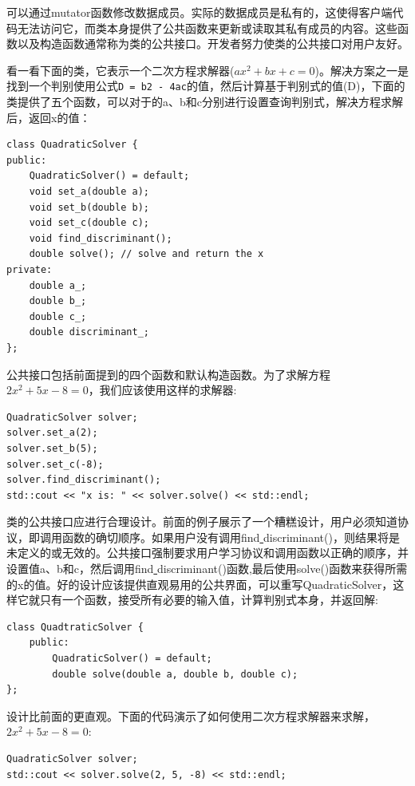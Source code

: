 可以通过mutator函数修改数据成员。实际的数据成员是私有的，这使得客户端代码无法访问它，而类本身提供了公共函数来更新或读取其私有成员的内容。这些函数以及构造函数通常称为类的公共接口。开发者努力使类的公共接口对用户友好。 \par
看一看下面的类，它表示一个二次方程求解器($ax^2 + bx + c = 0$)。解决方案之一是找到一个判别使用公式\texttt{D = b2 - 4ac}的值，然后计算基于判别式的值(D)，下面的类提供了五个函数，可以对于的a、b和c分别进行设置查询判别式，解决方程求解后，返回x的值： \par

\begin{lstlisting}[caption={}]
class QuadraticSolver {
public:
	QuadraticSolver() = default;
	void set_a(double a);
	void set_b(double b);
	void set_c(double c);
	void find_discriminant();
	double solve(); // solve and return the x
private:
	double a_;
	double b_;
	double c_;
	double discriminant_;
};
\end{lstlisting}

公共接口包括前面提到的四个函数和默认构造函数。为了求解方程$2x^2 + 5x - 8 = 0$，我们应该使用这样的求解器: \par

\begin{lstlisting}[caption={}]
QuadraticSolver solver;
solver.set_a(2);
solver.set_b(5);
solver.set_c(-8);
solver.find_discriminant();
std::cout << "x is: " << solver.solve() << std::endl;
\end{lstlisting}

类的公共接口应进行合理设计。前面的例子展示了一个糟糕设计，用户必须知道协议，即调用函数的确切顺序。如果用户没有调用find\underline{ }discriminant()，则结果将是未定义的或无效的。公共接口强制要求用户学习协议和调用函数以正确的顺序，并设置值a、b和c，然后调用find\underline{ }discriminant()函数,最后使用solve()函数来获得所需的x的值。好的设计应该提供直观易用的公共界面，可以重写QuadraticSolver，这样它就只有一个函数，接受所有必要的输入值，计算判别式本身，并返回解: \par

\begin{lstlisting}[caption={}]
class QuadtraticSolver {
	public:
		QuadraticSolver() = default;
		double solve(double a, double b, double c);
};
\end{lstlisting}

设计比前面的更直观。下面的代码演示了如何使用二次方程求解器来求解，$2x^2 + 5x - 8 = 0$: \par

\begin{lstlisting}[caption={}]
QuadraticSolver solver;
std::cout << solver.solve(2, 5, -8) << std::endl;
\end{lstlisting}

